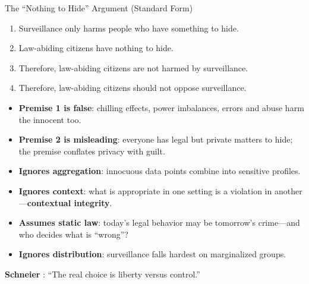 ﻿\documentclass[aspectratio=169,11pt]{beamer}
\begin{document}
\begin{frame}[shrink=10]{The ``Nothing to Hide'' Argument (Standard Form)}
\begin{probox}
\scriptsize
\begin{enumerate}
    \item Surveillance only harms people who have something to hide.
    \item Law-abiding citizens have nothing to hide.
    \item Therefore, law-abiding citizens are not harmed by surveillance.
    \item Therefore, law-abiding citizens should not oppose surveillance.
\end{enumerate}
\end{probox}

\begin{objectionbox}
\scriptsize
\begin{itemize}
    \item \textbf{Premise 1 is false}: chilling effects, power imbalances, errors and abuse harm the innocent too.
    \item \textbf{Premise 2 is misleading}: everyone has legal but private matters to hide; the premise conflates privacy with guilt.
    \item \textbf{Ignores aggregation}: innocuous data points combine into sensitive profiles.
    \item \textbf{Ignores context}: what is appropriate in one setting is a violation in another---\textbf{contextual integrity}.
    \item \textbf{Assumes static law}: today's legal behavior may be tomorrow's crime---and who decides what is ``wrong''?
    \item \textbf{Ignores distribution}: surveillance falls hardest on marginalized groups.
\end{itemize}
\end{objectionbox}

{\scriptsize \textbf{Schneier} \parencite{schneier_data_goliath}: ``The real choice is liberty versus control.''}
\end{frame}
\end{document}
